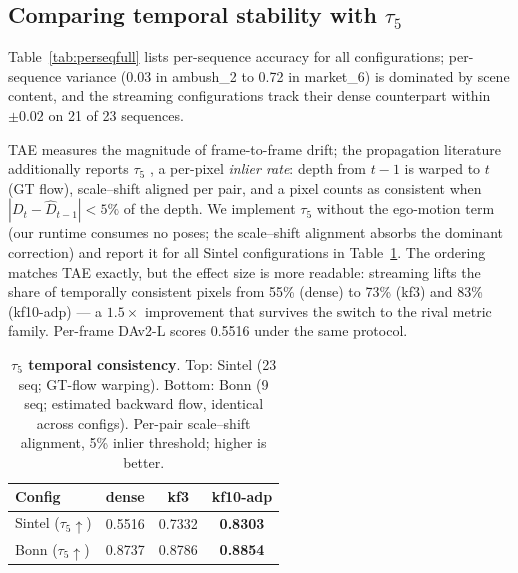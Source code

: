 \documentclass[10pt,twocolumn]{article}
\begin{document}
\subsection{Comparing temporal stability with $\tau_5$}
\label{sec:tau5}
Table~\ref{tab:perseqfull} lists per-sequence accuracy for all
configurations; per-sequence variance (0.03 in ambush\_2 to 0.72 in
market\_6) is dominated by scene content, and the streaming configurations
track their dense counterpart within $\pm 0.02$ on 21 of 23 sequences.


TAE measures the magnitude of frame-to-frame drift; the propagation
literature additionally reports $\tau_5$
\cite{velodepth}, a per-pixel \emph{inlier rate}: depth from $t{-}1$ is
warped to $t$ (GT flow), scale--shift aligned per pair, and a pixel counts
as consistent when $|D_t - \widehat{D}_{t-1}| < 5\%$ of the depth. We
implement $\tau_5$ without the ego-motion term (our runtime consumes no
poses; the scale--shift alignment absorbs the dominant correction) and
report it for all Sintel configurations in Table~\ref{tab:tau5}. The
ordering matches TAE exactly, but the effect size is more readable:
streaming lifts the share of temporally consistent pixels from 55\%
(dense) to 73\% (kf3) and 83\% (kf10-adp) --- a $1.5\times$ improvement
that survives the switch to the rival metric family. Per-frame DAv2-L
scores 0.5516 under the same protocol.

\begin{table}[t]
\centering\small
\caption{\textbf{$\tau_5$ temporal consistency}. Top: Sintel (23 seq;
GT-flow warping). Bottom: Bonn (9 seq; estimated backward flow, identical
across configs). Per-pair scale--shift alignment, 5\% inlier threshold;
higher is better.}
\label{tab:tau5}
\begin{tabular}{lccc}
\toprule
Config & dense & kf3 & kf10-adp\\
\midrule
Sintel ($\tau_5{\uparrow}$) & 0.5516 & 0.7332 & \textbf{0.8303}\\
Bonn ($\tau_5{\uparrow}$) & 0.8737 & 0.8786 & \textbf{0.8854}\\
\bottomrule
\end{tabular}
\end{table}
\end{document}
